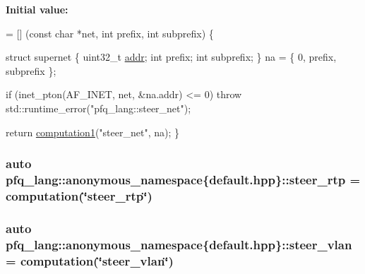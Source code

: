{\bfseries Initial value\-:}
\begin{DoxyCode}
= [] (\textcolor{keyword}{const} \textcolor{keywordtype}{char} *net, \textcolor{keywordtype}{int} prefix, \textcolor{keywordtype}{int} subprefix) \{

                                \textcolor{keyword}{struct }supernet \{
                                    uint32\_t \hyperlink{namespacepfq__lang_1_1anonymous__namespace_02default_8hpp_03_aafce8334d1be83bff9a2115439c8c453}{addr};
                                    \textcolor{keywordtype}{int}      prefix;
                                    \textcolor{keywordtype}{int}      subprefix;
                                \} na = \{ 0, prefix, subprefix \};

                                \textcolor{keywordflow}{if} (inet\_pton(AF\_INET, net, &na.addr) <= 0)
                                    \textcolor{keywordflow}{throw} std::runtime\_error(\textcolor{stringliteral}{"pfq\_lang::steer\_net"});

                                \textcolor{keywordflow}{return} \hyperlink{namespacepfq__lang_a58e7e358fc7c95121f74d56c094b1627}{computation1}(\textcolor{stringliteral}{"steer\_net"}, na);
                             \}
\end{DoxyCode}
\hypertarget{namespacepfq__lang_1_1anonymous__namespace_02default_8hpp_03_a16b18fdc10f8dd8c0974d9f0d6c13af9}{
\subsubsection[{steer\-\_\-rtp}]{\setlength{\rightskip}{0pt plus 5cm}auto pfq\-\_\-lang\-::anonymous\-\_\-namespace\{default.\-hpp\}\-::steer\-\_\-rtp = {\bf computation}(\char`\"{}steer\-\_\-rtp\char`\"{})}}\label{namespacepfq__lang_1_1anonymous__namespace_02default_8hpp_03_a16b18fdc10f8dd8c0974d9f0d6c13af9}
\hypertarget{namespacepfq__lang_1_1anonymous__namespace_02default_8hpp_03_ad32804252244d5b572b9f5fe0cdda675}{
\subsubsection[{steer\-\_\-vlan}]{\setlength{\rightskip}{0pt plus 5cm}auto pfq\-\_\-lang\-::anonymous\-\_\-namespace\{default.\-hpp\}\-::steer\-\_\-vlan = {\bf computation}(\char`\"{}steer\-\_\-vlan\char`\"{})}}\label{namespacepfq__lang_1_1anonymous__namespace_02default_8hpp_03_ad32804252244d5b572b9f5fe0cdda675}
